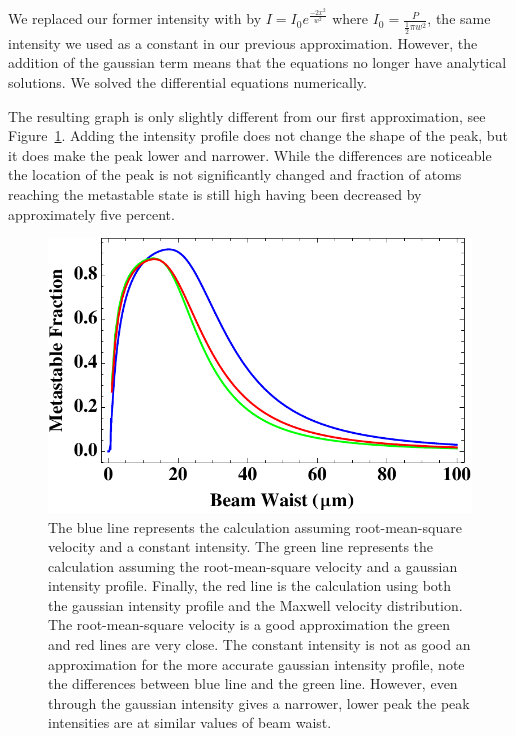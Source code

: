 \documentclass[prb,preprint]{revtex4-1}
\begin{document}
We replaced our former intensity with by $I = I_0 e^{\frac{-2 x^2}{w^2}}$ where $I_0 = \frac{P}{\frac{1}{2}\pi w^2}$, the same intensity we used as a constant in our previous approximation. However, the addition of the gaussian term means that the equations no longer have analytical solutions. We solved the differential equations numerically.

The resulting graph is only slightly different from our first approximation, see Figure~\ref{AllGraph}. Adding the intensity profile does not change the shape of the peak, but it does make the peak lower and narrower. While the differences are noticeable the location of the peak is not significantly changed and fraction of atoms reaching the metastable state is still high having been decreased by approximately five percent.

\begin{figure}[h!]
\centering
\includegraphics[width=6in]{AllGraph.pdf}
\caption{The blue line represents the calculation assuming root-mean-square velocity and a constant intensity. The green line represents the calculation assuming the root-mean-square velocity and a gaussian intensity profile. Finally, the red line is the calculation using both the gaussian intensity profile and the Maxwell velocity distribution. The root-mean-square velocity is a good approximation the green and red lines are very close. The constant intensity is not as good an approximation for the more accurate gaussian intensity profile, note the differences between blue line and the green line. However, even through the gaussian intensity gives a narrower, lower peak the peak intensities are at similar values of beam waist.}
\label{AllGraph}
\end{figure}
\end{document}
